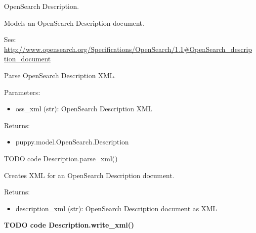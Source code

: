 \documentclass[letterpaper,10pt,english]{sphinxmanual}
\begin{document}
\begin{fulllineitems}
\label{api2.0:puppy.model.Description}
OpenSearch Description.

Models an OpenSearch Description document.

See: \href{http://www.opensearch.org/Specifications/OpenSearch/1.1\#OpenSearch\_description\_document}{http://www.opensearch.org/Specifications/OpenSearch/1.1\#OpenSearch\_description\_document}

\begin{fulllineitems}
\label{api2.0:puppy.model.Description.parse_xml}
Parse OpenSearch Description XML.

Parameters:
\begin{itemize}
\item {} 
oss\_xml (str): OpenSearch Description XML

\end{itemize}

Returns:
\begin{itemize}
\item {} 
puppy.model.OpenSearch.Description

\end{itemize}

TODO code Description.parse\_xml()

\end{fulllineitems}


\begin{fulllineitems}
\label{api2.0:puppy.model.Description.write_xml}
Creates XML for an OpenSearch Description document.

Returns:
\begin{itemize}
\item {} 
description\_xml (str): OpenSearch Description document as XML

\end{itemize}

\textbf{TODO code Description.write\_xml()}

\end{fulllineitems}


\end{fulllineitems}
\end{document}
